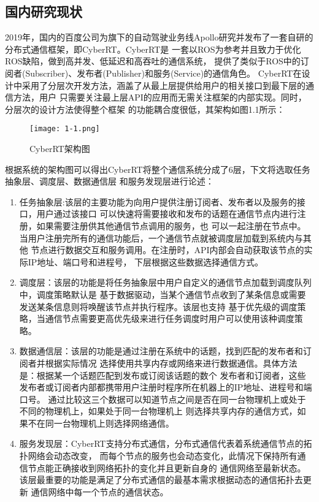 \subsection{国内研究现状}
2019年，国内的百度公司为旗下的自动驾驶业务线Apollo研究并发布了一套自研的分布式通信框架，即CyberRT。CyberRT是
一套以ROS为参考并且致力于优化ROS缺陷，做到高并发、低延迟和高吞吐的通信系统，
提供了类似于ROS中的订阅者(Subscriber)、发布者(Publisher)和服务(Service)的通信角色。
CyberRT在设计中采用了分层次开发方法，涵盖了从最上层提供给用户的相关接口到最下层的通信方法，用户
只需要关注最上层API的应用而无需关注框架的内部实现。同时，分层次的设计方法使得整个框架
的功能耦合度很低，其架构如图1.1所示\cite{cyberrt}：
\begin{figure}[H]
  \centering
  \texttt{[image: 1-1.png]}
  \caption{CyberRT架构图}
  \label{1}
\end{figure}
根据系统的架构图可以得出CyberRT将整个通信系统分成了6层，下文将选取任务抽象层、调度层、数据通信层
和服务发现层进行论述：
\begin{enumerate}
  \item 任务抽象层:该层的主要功能为向用户提供注册订阅者、发布者以及服务的接口，用户通过该接口
  可以快速将需要接收和发布的话题在通信节点内进行注册，如果需要注册供其他通信节点调用的服务，也
  可以一起注册在节点中。当用户注册完所有的通信功能后，一个通信节点就被调度层加载到系统内与其他
  节点进行数据交互和服务调用。在注册时，API内部会自动获取该节点的实际IP地址、端口号和进程号，
  下层根据这些数据选择通信方式。
  \item 调度层：该层的功能是将任务抽象层中用户自定义的通信节点加载到调度队列中，调度策略默认是
  基于数据驱动，当某个通信节点收到了某条信息或需要发送某条信息则将唤醒该节点并执行程序。该层也支持
  基于优先级的调度策略，当通信节点需要更高优先级来进行任务调度时用户可以使用该种调度策略。
  \item 数据通信层：该层的功能是通过注册在系统中的话题，找到匹配的发布者和订阅者并根据实际情况
  选择使用共享内存或网络来进行数据通信。具体方法是：根据某一个话题匹配到发布或订阅该话题的数个
  发布者和订阅者，这些发布者或订阅者内部都携带用户注册时程序所在机器上的IP地址、进程号和端口号。
  通过比较这三个数据可以知道节点之间是否在同一台物理机上或处于不同的物理机上，如果处于同一台物理机上
  则选择共享内存的通信方式，如果不在同一台物理机上则选择网络通信。
  \item 服务发现层：CyberRT支持分布式通信，分布式通信代表着系统通信节点的拓扑网络会动态改变，
  而每个节点的服务也会动态变化，此情况下保持所有通信节点能正确接收到网络拓扑的变化并且更新自身的
  通信网络至最新状态。该层最重要的功能是满足了分布式通信的最基本需求根据动态的通信拓扑去更新
  通信网络中每一个节点的通信状态。
\end{enumerate}

